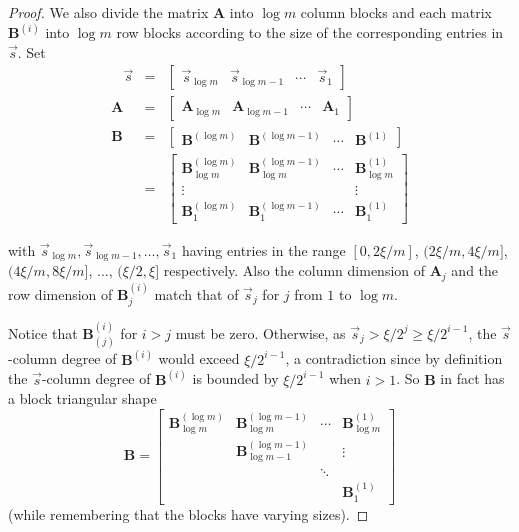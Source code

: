 \begin{proof}
We also divide the matrix $\mathbf{A}$ into $\log m$ column blocks
and each matrix $\mathbf{B}^{\left(i\right)}$ into $\log m$ row
blocks according to the size of the corresponding entries in $\vec{s}$.
Set 
\begin{eqnarray*}
~~~~\vec{s} & = & \left[\begin{array}{cccc}
\vec{s}_{\log m} & \vec{s}_{\log m-1} & \cdots & \vec{s}_{1}\end{array}\right]\\
\mathbf{A} & = & \left[\begin{array}{cccc}
\mathbf{A}_{\log m} & \mathbf{A}_{\log m-1} & \cdots & \mathbf{A}_{1}\end{array}\right]\\
\mathbf{B} & = & \left[\begin{array}{cccc}
\mathbf{B}^{\left(\log m\right)} & \mathbf{B}^{\left(\log m-1\right)} & \cdots & \mathbf{B}^{\left(1\right)}\end{array}\right]\\
 & = & \left[\begin{array}{cccc}
\mathbf{B}_{\log m}^{\left(\log m\right)} & \mathbf{B}_{\log m}^{\left(\log m-1\right)} & \cdots & \mathbf{B}_{\log m}^{\left(1\right)}\\
\vdots &  &  & \vdots\\
\mathbf{B}_{1}^{\left(\log m\right)} & \mathbf{B}_{1}^{\left(\log m-1\right)} & \cdots & \mathbf{B}_{1}^{\left(1\right)}
\end{array}\right]
\end{eqnarray*}
\begin{comment}
\wei{Shouldn't they be reversed? We are not assign to $\vec{s},\mathbf{A},\mathbf{B},$
but to $\vec{s}_{i},\mathbf{A}_{i},\mathbf{B}_{i}$. Same issue with
other assignments as well} \george{I think it is more readable this
way.} 
\end{comment}
with $\vec{s}_{\log m},\vec{s}_{\log m-1},\dots,\vec{s}_{1}$ having
entries in the range $\left[0,2\xi/m\right]$, $(2\xi/m,4\xi/m]$,
$(4\xi/m,8\xi/m]$, ..., $(\xi/2,\xi]$ respectively. Also the column
dimension of $\mathbf{A}_{j}$ and the row dimension of $\mathbf{B}_{j}^{\left(i\right)}$
match that of $\vec{s}_{j}$ for $j$ from $1$ to $\log m$.

Notice that $\mathbf{B}_{(j)}^{(i)}$ for $i>j$ must be zero. Otherwise,
as $\vec{s}_{j}>\xi/2^{j}\ge\xi/2^{i-1}$, the $\vec{s}$-column degree
of $\mathbf{B}^{(i)}$ would exceed $\xi/2^{i-1}$, a contradiction
since by definition the $\vec{s}$-column degree of $\mathbf{B}^{(i)}$
is bounded by $\xi/2^{i-1}$ when $i>1$. So $\mathbf{B}$ in fact
has a block triangular shape 
\[
\mathbf{B}=\left[\begin{array}{cccc}
\mathbf{B}_{\log m}^{\left(\log m\right)} & \mathbf{B}_{\log m}^{\left(\log m-1\right)} & \cdots & \mathbf{B}_{\log m}^{\left(1\right)}\\
 & \mathbf{B}_{\log m-1}^{\left(\log m-1\right)} &  & \vdots\\
 &  & \ddots\\
 &  &  & \mathbf{B}_{1}^{\left(1\right)}
\end{array}\right]
\]
 (while remembering that the blocks have varying sizes).


\end{proof}
